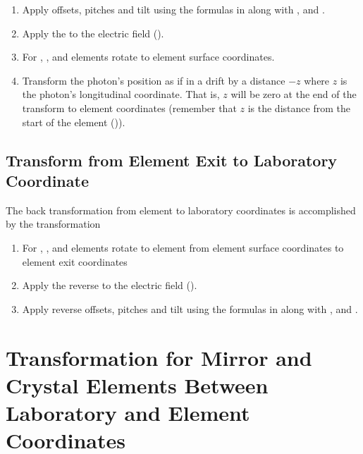   \begin{enumerate}
  \item
Apply offsets, pitches and tilt using the formulas in
 along with , and .
  \item
Apply the  to the electric field ().
  \item
For , , and  elements
rotate to element surface coordinates.
 \item
Transform the photon's position as if in a drift by a distance $-z$
where $z$ is the photon's longitudinal coordinate. That is, $z$ will
be zero at the end of the transform to element coordinates (remember
that $z$ is the distance from the start of the element
()).

\end{enumerate}

\subsection{Transform from Element Exit to Laboratory Coordinate}

The back transformation from element to laboratory coordinates is
accomplished by the transformation
  \begin{enumerate}
  \item
For , , and  elements
rotate to element from element surface coordinates to element exit coordinates
  \item
Apply the reverse  to the electric field ().
  \item
Apply reverse offsets, pitches and tilt using the formulas in
 along with , and .
  \end{enumerate}

\section[Mirror and Crystal Element Transformation]
{Transformation for Mirror and Crystal Elements Between 
Laboratory and Element Coordinates}
\label{s:photon.lab.ele}


